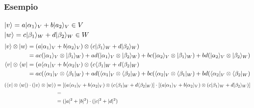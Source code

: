 \documentclass[12pt, a4paper]{report}
\begin{document}
\subsubsection{Esempio}
$| v \rangle = a| \alpha_{1} \rangle_{V}+b| a_{2} \rangle_{V}\in V$\\
$| w \rangle = c| \beta_{1} \rangle_{W}+d| \beta_{2} \rangle_{W}\in W$ 
\begin{equation*}
    \begin{split}
        | v \rangle\otimes| w \rangle & = (a| \alpha_{1} \rangle_{V}+b| \alpha_{2} \rangle_{V})\otimes(c| \beta_{1} \rangle_{W}+d| \beta_{2} \rangle_{W}) \\
        & = ac(| \alpha_{1} \rangle_{V}\otimes| \beta_{1} \rangle_{W})+ad(| \alpha_{1} \rangle_{V}\otimes| \beta_{2} \rangle_{W})+bc(| \alpha_{2} \rangle_{V}\otimes| \beta_{1} \rangle_{W})+bd(| \alpha_{2} \rangle_{V}\otimes| \beta_{2} \rangle_{W}) \\
        \langle v |\otimes\langle w | & = (a\langle \alpha_{1} |_{V}+b\langle \alpha_{2} |_{V})\otimes(c\langle \beta_{1} |_{W}+d\langle \beta_{2} |_{W}) \\
        & = ac(\langle \alpha_{1} |_{V}\otimes\langle \beta_{1} |_{W})+ad(\langle \alpha_{1} |_{V}\otimes\langle \beta_{2} |_{W})+bc(\langle \alpha_{2} |_{V}\otimes\langle \beta_{1} |_{W})+bd(\langle \alpha_{2} |_{V}\otimes\langle \beta_{2} |_{W})
    \end{split}
\end{equation*}
\footnotesize
\begin{equation*}
    \begin{split}
        (\langle v |\otimes\langle w |)\cdot(| v \rangle\otimes| w \rangle) & = [(a\langle \alpha_{1} |_{V}+b\langle \alpha_{2} |_{V})\otimes(c\langle \beta_{1} |_{W}+d\langle \beta_{2} |_{W})]\cdot[(a| \alpha_{1} \rangle_{V}+b| \alpha_{2} \rangle_{V})\otimes(c| \beta_{1} \rangle_{W}+d| \beta_{2} \rangle_{W})] \\
        & = \\
        & = (|a|^{2}+|b|^{2})\cdot(|c|^{2}+|d|^{2})
    \end{split}
\end{equation*}
\normalsize
\end{document}
